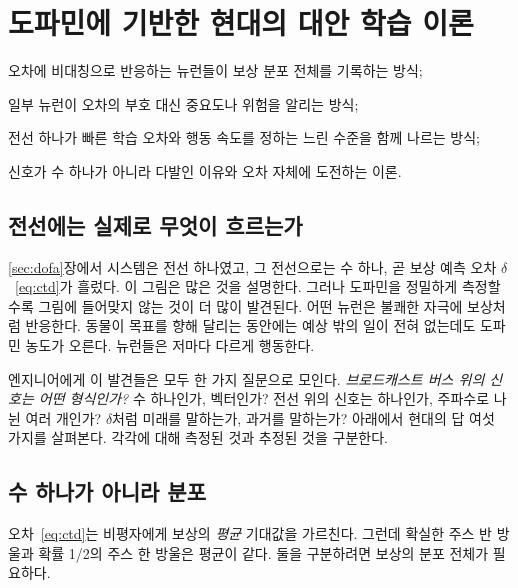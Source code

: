 \chapter{도파민에 기반한 현대의 대안 학습 이론}
\label{sec:dofaalt}
\begin{chaptergoals}
\item 오차에 비대칭으로 반응하는  뉴런들이 보상 분포 전체를 기록하는 방식;
\item 일부  뉴런이 오차의 부호 대신 중요도나 위험을 알리는 방식;
\item 전선 하나가 빠른 학습 오차와 행동 속도를 정하는 느린 수준을 함께 나르는 방식;
\item {} 신호가 수 하나가 아니라 다발인 이유와 오차 자체에 도전하는 이론.
\end{chaptergoals}

\section{전선에는 실제로 무엇이 흐르는가}

\ref{sec:dofa}장에서  시스템은 전선 하나였고, 그 전선으로는 수 하나, 곧 보상 예측 오차 $\delta$~\eqref{eq:ctd}가 흘렀다. 이 그림은 많은 것을 설명한다. 그러나 도파민을 정밀하게 측정할수록 그림에 들어맞지 않는 것이 더 많이 발견된다. 어떤 뉴런은 불쾌한 자극에 보상처럼 반응한다. 동물이 목표를 향해 달리는 동안에는 예상 밖의 일이 전혀 없는데도 도파민 농도가 오른다.  뉴런들은 저마다 다르게 행동한다.

엔지니어에게 이 발견들은 모두 한 가지 질문으로 모인다. \emph{브로드캐스트 버스 위의 신호는 어떤 형식인가?} 수 하나인가, 벡터인가? 전선 위의 신호는 하나인가, 주파수로 나뉜 여러 개인가? $\delta$처럼 미래를 말하는가, 과거를 말하는가? 아래에서 현대의 답 여섯 가지를 살펴본다. 각각에 대해 측정된 것과 추정된 것을 구분한다.

\section{수 하나가 아니라 분포}

오차~\eqref{eq:ctd}는 비평자에게 보상의 \emph{평균} 기대값을 가르친다. 그런데 확실한 주스 반 방울과 확률 1/2의 주스 한 방울은 평균이 같다. 둘을 구분하려면 보상의 분포 전체가 필요하다.

